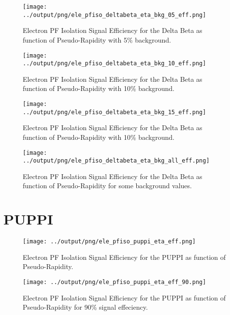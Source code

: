 \documentclass[11pt]{book}
\begin{document}
\begin{figure}[htb]
\centering
\texttt{[image: ../output/png/ele\_pfiso\_deltabeta\_eta\_bkg\_05\_eff.png]}
\caption{Electron PF Isolation Signal Efficiency for the Delta Beta as function of Pseudo-Rapidity with 5\% background.}
\label{fig:ele_pfiso_eta_bkg_deltabeta_bkg_05_eff}
\end{figure}

\begin{figure}[htb]
\centering
\texttt{[image: ../output/png/ele\_pfiso\_deltabeta\_eta\_bkg\_10\_eff.png]}
\caption{Electron PF Isolation Signal Efficiency for the Delta Beta as function of Pseudo-Rapidity with 10\% background.}
\label{fig:ele_pfiso_eta_bkg_deltabeta_bkg_10_eff}
\end{figure}

\begin{figure}[htb]
\centering
\texttt{[image: ../output/png/ele\_pfiso\_deltabeta\_eta\_bkg\_15\_eff.png]}
\caption{Electron PF Isolation Signal Efficiency for the Delta Beta as function of Pseudo-Rapidity with 10\% background.}
\label{fig:ele_pfiso_eta_bkg_deltabeta_bkg_15_eff}
\end{figure}

\begin{figure}[htb]
\centering
\texttt{[image: ../output/png/ele\_pfiso\_deltabeta\_eta\_bkg\_all\_eff.png]}
\caption{Electron PF Isolation Signal Efficiency for the Delta Beta as function of Pseudo-Rapidity for some background values.}
\label{fig:ele_pfiso_eta_bkg_deltabeta_bkg_all_eff}
\end{figure}
\clearpage

\section{PUPPI}
\begin{figure}[htb]
\centering
\texttt{[image: ../output/png/ele\_pfiso\_puppi\_eta\_eff.png]}
\caption{Electron PF Isolation Signal Efficiency for the PUPPI as function of Pseudo-Rapidity.}
\label{fig:ele_pfiso_eta_eff_puppi}
\end{figure}

\begin{figure}[htb]
\centering
\texttt{[image: ../output/png/ele\_pfiso\_puppi\_eta\_eff\_90.png]}
\caption{Electron PF Isolation Signal Efficiency for the PUPPI as function of Pseudo-Rapidity for 90\% signal effeciency.}
\label{fig:ele_pfiso_eta_eff_puppi_eff_90}
\end{figure}
\end{document}
